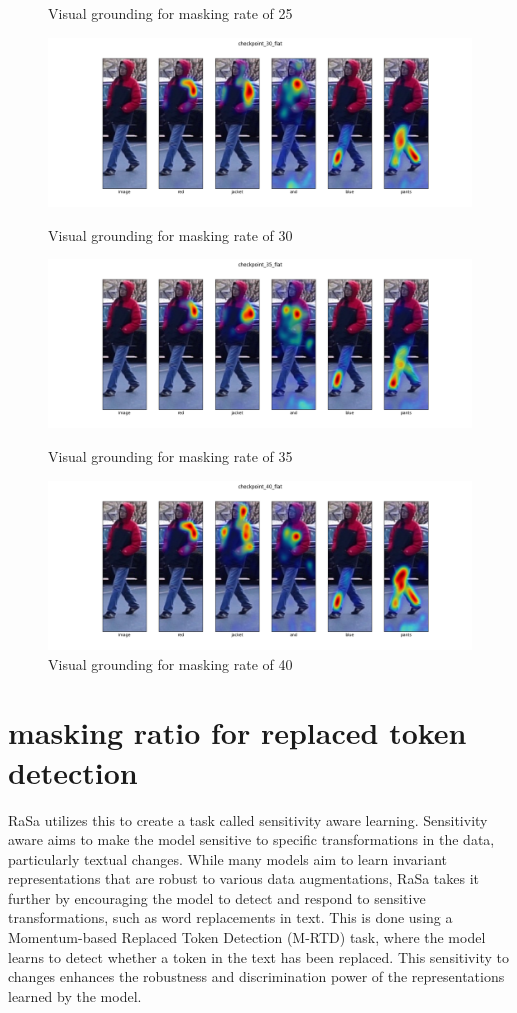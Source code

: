 \begin{figure}
  \caption{Visual grounding for masking rate of 25}
  \includegraphics[width=\linewidth]{img/mrtd_masking_ratio/mrtd-checkpoint_30_flat.png}
  \caption{Visual grounding for masking rate of 30}
  \includegraphics[width=\linewidth]{img/mrtd_masking_ratio/mrtd-checkpoint_35_flat.png}
  \caption{Visual grounding for masking rate of 35}
  \includegraphics[width=\linewidth]{img/mrtd_masking_ratio/mrtd-checkpoint_40_flat.png}
  \caption{Visual grounding for masking rate of 40}
\end{figure}

\section{masking ratio for replaced token detection}
RaSa utilizes this to create a task called sensitivity aware learning.
Sensitivity aware aims to make the model sensitive to specific transformations in the data, particularly textual changes. While many models aim to learn invariant representations that are robust to various data augmentations, RaSa takes it further by encouraging the model to detect and respond to sensitive transformations, such as word replacements in text. This is done using a Momentum-based Replaced Token Detection (M-RTD) task, where the model learns to detect whether a token in the text has been replaced. This sensitivity to changes enhances the robustness and discrimination power of the representations learned by the model.

